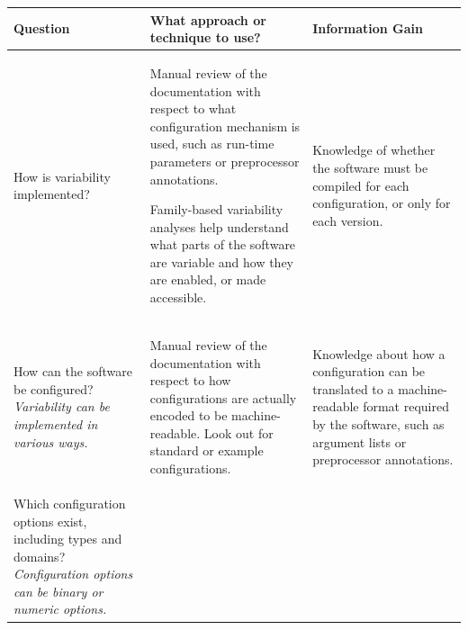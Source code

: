 \begin{table}
  \centering
  
  \begin{tabular}{L{0.22\textwidth} L{0.48\textwidth} L{0.3\textwidth}}
  
  	\toprule 
    {\bf Question} & {\bf What approach or technique to use?} & {\bf
    Information Gain} \\
    \midrule
    
    {How is variability implemented?\linebreak
	{\footnotesize\it }} & 
	
	{\smaller\begin{compactitem}
	  \item Manual review of the documentation with respect to what configuration
	  mechanism is used, such as run-time parameters or preprocessor annotations.
	  \item Family-based variability analyses help understand what parts of the
	  software are variable and how they are enabled, or made accessible.	  
	\end{compactitem}} & 
	
	{Knowledge of whether the software must be compiled for each configuration, or only for each version.}\\
	
	\midrule
	
	{How can the software be configured?\linebreak
	{\footnotesize\it Variability can be implemented in various ways.}} &
	
	{\smaller\begin{compactitem}
	  \item Manual review of the documentation with respect to how configurations
	  are actually encoded to be machine-readable. Look out for standard or example
	  configurations.
	 \end{compactitem}}
	  &
	
	{Knowledge about how a configuration can be translated to a machine-readable
	format required by the software, such as argument lists or preprocessor annotations.}\\
	
	\midrule
	
	{Which configuration options exist, including types and domains?\linebreak
	{\footnotesize\it Configuration options can be binary or numeric options.}} & 
	

\end{tabular}
\end{table}
